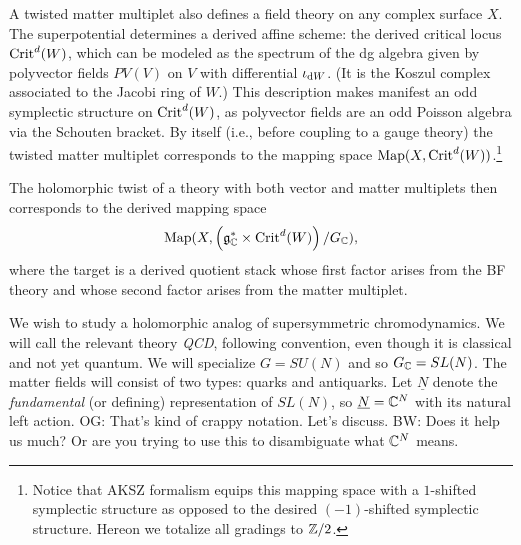 \documentclass[11pt]{amsart}
\def\brian#1{{\textcolor{blue!65!red}{BW: {#1}}}}
\def\owen#1{{\textcolor{violet!65!black}{OG: {#1}}}}
\begin{document}
\def\Sslash{\!\sslash\!}

A twisted matter multiplet also defines a field theory on any complex surface $X$. 
The superpotential determines a derived affine scheme: the derived critical locus ${\rm Crit}^d(W)$, which can be modeled as the spectrum of the dg algebra given by polyvector fields $PV(V)$ on $V$ with differential $\iota_{{\rm d} W}$.
(It is the Koszul complex associated to the Jacobi ring of $W$.)
This description makes manifest an odd symplectic structure on ${\rm Crit}^d(W)$,
as polyvector fields are an odd Poisson algebra via the Schouten bracket.
By itself (i.e., before coupling to a gauge theory) the twisted matter multiplet corresponds to the mapping space ${\rm Map}(X, {\rm Crit}^d(W))$.\footnote{Notice that AKSZ formalism equips this mapping space with a $1$-shifted symplectic structure as opposed to the desired $(-1)$-shifted symplectic structure.
Hereon we totalize all gradings to $\mathbb Z/2$.}

The holomorphic twist of a theory with both vector and matter multiplets then corresponds to the  derived mapping space
\[
{\rm Map}(X , \left( \mathfrak g_\mathbb C^*\times {\rm Crit}^d(W) \right)/ G_\mathbb C), 
\]
where the target is a derived quotient stack whose first factor arises from the BF theory and whose second factor arises from the matter multiplet.

We wish to study a holomorphic analog of supersymmetric chromodynamics.
We will call the relevant theory {\it QCD}, following convention, even though it is classical and not yet quantum.
We will specialize $G = SU(N)$ and so $G_\mathbb C = SL(N)$.
The matter fields will consist of two types: quarks and antiquarks.
Let $\underline{N}$ denote the {\em fundamental} (or defining) representation of $SL(N)$,
so $\underline{N} = \mathbb C^N$ with its natural left action.
\owen{That's kind of crappy notation. Let's discuss.}
\brian{Does it help us much? Or are you trying to use this to disambiguate what $\mathbb C^N$ means.}

\end{document}
